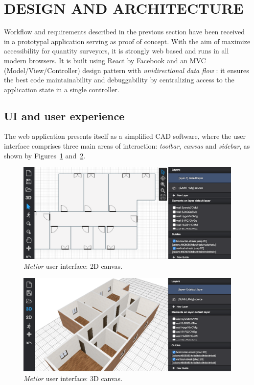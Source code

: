 \documentclass[a4paper,twoside]{article}
\begin{document}
%
\section{\uppercase{Design and Architecture}}
\label{sec:architecture}


\noindent
Workflow and requirements described in the previous section have been received in a prototypal application serving as proof of concept. With the aim of maximize accessibility for quantity surveyors, it is strongly web based and runs in all modern browsers. It is built using React by Facebook and an MVC (Model/View/Controller) design pattern with \emph{unidirectional data flow} \cite{redux}:  it ensures the best code maintainability and debuggability by centralizing access to the application state in a single controller.

\subsection{UI and user experience}

\noindent
The web application presents itself as a simplified CAD software, where the user interface comprises three main areas of interaction: \emph{toolbar}, \emph{canvas} and \emph{sidebar}, as shown by Figures~\ref{fig:ui2d} and~\ref{fig:ui3d}.

\begin{figure}[htbp] %
   \centering
   \includegraphics[width=1\linewidth]{images/2d}
   \caption{\emph{Metior} user interface: 2D canvas.}
   \label{fig:ui2d}
\end{figure}

\begin{figure}[htbp]
   \includegraphics[width=1\linewidth]{images/3d}
   \caption{\emph{Metior} user interface: 3D canvas.}
   \label{fig:ui3d}
\end{figure}
\end{document}
